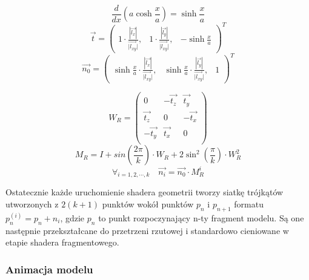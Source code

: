 \begin{equation*}
	\frac{d}{dx} \left( a \cosh \frac{x}{a} \right) = \sinh \frac{x}{a}
\end{equation*}
\begin{equation*}
	\vec{t} =
	\begin{pmatrix}
		1 \cdot \frac{|\vec{l_x}|}{\vec{|l_{xy}}|}, &
		1 \cdot \frac{|\vec{l_y}|}{\vec{|l_{xy}}|}, &
		-\sinh\frac{x}{a}
	\end{pmatrix}^T
\end{equation*}
\begin{equation*}
	\vec{n_0} =
	\begin{pmatrix}
		\sinh \frac{x}{a} \cdot \frac{|\vec{l_x}|}{\vec{|l_{xy}}|}, &
		\sinh \frac{x}{a} \cdot \frac{|\vec{l_y}|}{\vec{|l_{xy}}|}, &
		1
	\end{pmatrix}^T
\end{equation*}

\begin{equation*}
	W_R = 
	\begin{pmatrix}
		0 & -\vec{t_z} & \vec{t_y} \\
		\vec{t_z} & 0 & -\vec{t_x} \\
		-\vec{t_y} & \vec{t_x} & 0 \\
	\end{pmatrix}
\end{equation*}
\begin{equation*}
	M_R = I + sin \left(\frac{2\pi}{k} \right) \cdot W_R + 2\sin^2 \left(\frac{\pi}{k} \right) \cdot W_R^2
\end{equation*}
\begin{equation*}
	\forall_{i=1,2,\cdots, k} \hspace{1em} \vec{n_i} = \vec{n_0} \cdot M_R^i
\end{equation*}

Ostatecznie każde uruchomienie shadera geometrii tworzy siatkę trójkątów utworzonych z $2(k+1)$ punktów wokół punktów $p_n$ i $p_{n+1}$ formatu $p_n^{(i)} = p_n + n_i$, gdzie $p_n$ to punkt rozpoczynający n-ty fragment modelu. Są one następnie przekształcane do przetrzeni rzutowej i standardowo cieniowane w etapie shadera fragmentowego.

\subsubsection{Animacja modelu}

